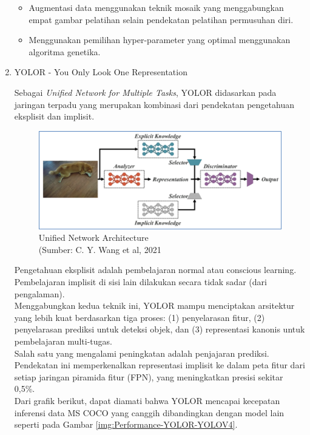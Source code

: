 \begin{enumerate}
\begin{itemize}
		\item Augmentasi data menggunakan teknik mosaik yang menggabungkan empat gambar pelatihan selain pendekatan pelatihan permusuhan diri.
		
		\item Menggunakan pemilihan hyper-parameter yang optimal menggunakan algoritma genetika.
		
	\end{itemize}
	
	\item YOLOR - You Only Look One Representation
	
	Sebagai \textit{Unified Network for Multiple Tasks}, YOLOR didasarkan pada jaringan terpadu yang merupakan kombinasi dari pendekatan pengetahuan eksplisit dan implisit.
	
	\begin{figure}[H]
		\vspace{-0.1cm}
		\begin{center}
			\includegraphics[width=0.8\columnwidth]{bab2/Gambar/Picture38.png}
		\end{center}
		\vspace{-0.2cm}
		\captionsetup{justification=centering}
		\caption{Unified Network Architecture\\(Sumber: C. Y. Wang et al, 2021}\label{img:Unified-Network-Architecture}
	\end{figure}
		Pengetahuan eksplisit adalah pembelajaran normal atau conscious learning. Pembelajaran implisit di sisi lain dilakukan secara tidak sadar (dari pengalaman).\\
		Menggabungkan kedua teknik ini, YOLOR mampu menciptakan arsitektur yang lebih kuat berdasarkan tiga proses: (1) penyelarasan fitur, (2) penyelarasan prediksi untuk deteksi objek, dan (3) representasi kanonis untuk pembelajaran multi-tugas.\\
		Salah satu yang mengalami peningkatan adalah penjajaran prediksi. Pendekatan ini memperkenalkan representasi implisit ke dalam peta fitur dari setiap jaringan piramida fitur (FPN), yang meningkatkan presisi sekitar 0,5\%.\\
		Dari grafik berikut, dapat diamati bahwa YOLOR mencapai kecepatan inferensi data MS COCO yang canggih dibandingkan dengan model lain seperti pada Gambar \ref{img:Performance-YOLOR-YOLOV4}.
		

\end{enumerate}
